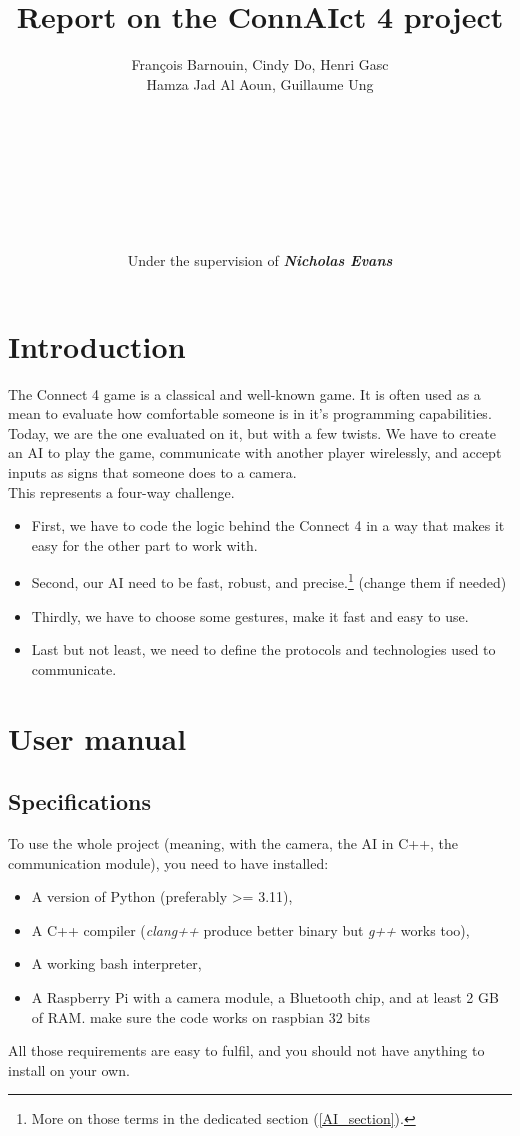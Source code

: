 \documentclass[12pt, a4paper, oneside]{report}
\title{\textbf{Report on the ConnAIct 4 project}}
\author{\normalsize François Barnouin, Cindy Do, Henri Gasc\\\normalsize Hamza Jad Al Aoun, Guillaume Ung\\\\\\\\\\\\\\\\\\Under the supervision of \textbf{\textit{Nicholas Evans}}}
\date{}
\begin{document}
	\maketitle
	\tableofcontents

	\chapter{Introduction}
	The Connect 4 game is a classical and well-known game. It is often used as a mean to evaluate how comfortable someone is in it's programming capabilities. \\
	Today, we are the one evaluated on it, but with a few twists. We have to create an AI to play the game, communicate with another player wirelessly, and accept inputs as signs that someone does to a camera. \\
	This represents a four-way challenge.
	\begin{itemize}
		\item First, we have to code the logic behind the Connect 4 in a way that makes it easy for the other part to work with.
		\item Second, our AI need to be fast, robust, and precise.\footnote{More on those terms in the dedicated section (\ref{AI_section}).} (change them if needed)
		\item Thirdly, we have to choose some gestures, make it fast and easy to use.
		\item Last but not least, we need to define the protocols and technologies used to communicate.
	\end{itemize}

	\chapter{User manual}

	\section{Specifications}
	To use the whole project (meaning, with the camera, the AI in C++, the communication module), you need to have installed:
	\begin{itemize}
		\item A version of Python (preferably >= 3.11),
		\item A C++ compiler (\textit{clang++} produce better binary but \textit{g++} works too),
		\item A working bash interpreter,
		\item A Raspberry Pi with a camera module, a Bluetooth chip, and at least 2 GB of RAM. make sure the code works on raspbian 32 bits
	\end{itemize}
	All those requirements are easy to fulfil, and you should not have anything to install on your own. \\
\end{document}
